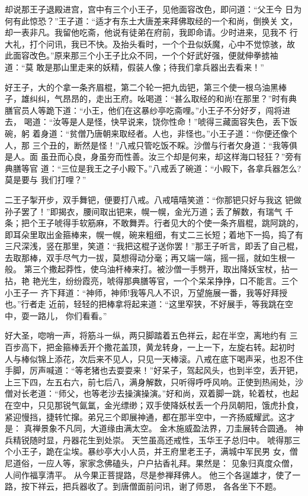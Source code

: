 却说那王子退殿进宫，宫中有三个小王子，见他面容改色，即问道：“父王今
日为何有此惊恐？”王子道：“适才有东土大唐差来拜佛取经的一个和尚，倒换关
文，却一表非凡。我留他吃斋，他说有徒弟在府前，我即命请。少时进来，见我不
行大礼，打个问讯，我已不快。及抬头看时，一个个丑似妖魔，心中不觉惊骇，故
此面容改色。”原来那三个小王子比众不同，一个个好武好强，便就伸拳掳袖道：“莫
敢是那山里走来的妖精，假装人像；待我们拿兵器出去看来！”

好王子，大的个拿一条齐眉棍，第二个轮一把九齿钯，第三个使一根乌油黑棒
子，雄纠纠，气昂昂的，走出王府。吆喝道：“甚么取经的和尚!在那里？”时有典
膳官员人等跪下道：“小王，他们在这暴纱亭吃斋哩。”小王子不分好歹，闯将进去，
喝道：“汝等是人是怪，快早说来，饶你性命！”唬得三藏面容失色，丢下饭碗，躬
着身道：“贫僧乃唐朝来取经者。人也，非怪也。”小王子道：“你便还像个人，那
三个丑的，断然是怪！”八戒只管吃饭不睬。沙僧与行者欠身道：“我等俱是人。面
虽丑而心良，身虽夯而性善。汝三个却是何来，却这样海口轻狂？”旁有典膳等官
道：“三位是我王之子小殿下。”八戒丢了碗道：“小殿下，各拿兵器怎么?莫是要与
我们打哩？”

二王子掣开步，双手舞钯，便要打八戒。八戒嘻嘻笑道：“你那钯只好与我这
钯做孙子罢了！”即揭衣，腰间取出钯来，幌一幌，金光万道；丢了解数，有瑞气
千条；把个王子唬得手软筋麻，不敢舞弄。行者见大的个使一条齐眉棍，跳阿跳的，
即耳朵里取出金箍棒来，幌一幌，碗来粗细，有丈二三长短；着地下一捣，捣了有
三尺深浅，竖在那里，笑道：“我把这棍子送你罢！”那王子听言，即丢了自己棍，
去取那棒，双手尽气力一拔，莫想得动分毫；再又端一端，摇一摇，就如生根一般。
第三个撒起莽性，使乌油杆棒来打。被沙僧一手劈开，取出降妖宝杖，拈一拈，艳
艳光生，纷纷霞亮，唬得那典膳等官，一个个呆呆挣挣，口不能言。三个小王子一
齐下拜道：“神师，神师!我等凡人不识，万望施展一番，我等好拜授也。”行者走
近前，轻轻的把棒拿将起来道：“这里窄狭，不好展手，等我跳在空中，耍一路儿，
你们看看。”

好大圣，唿哨一声，将筋斗一纵，两只脚踏着五色祥云，起在半空，离地约有
三百步高下，把金箍棒丢开个撒花盖顶，黄龙转身，一上一下，左旋右转。起初时
人与棒似锦上添花，次后来不见人，只见一天棒滚。八戒在底下喝声采，也忍不住
手脚，厉声喊道：“等老猪也去耍耍来！”好呆子，驾起风头，也到半空，丢开钯，
上三下四，左五右六，前七后八，满身解数，只听得呼呼风响。正使到热闹处，沙
僧对长老道：“师父，也等老沙去操演操演。”好和尚，双着脚一跳，轮着杖，也起
在空中，只见那锐气氤氲，金光缥缈；双手使降妖杖丢一个丹凤朝阳，饿虎扑食，
紧迎慢挡，捷转忙撺。弟兄三个即展神通，都在那半空中，一齐扬威耀武。这才是：
真禅景象不凡同，大道缘由满太空。
金木施威盈法界，刀圭展转合圆通。
神兵精锐随时显，丹器花生到处崇。
天竺虽高还戒性，玉华王子总归中。
唬得那三个小王子，跪在尘埃。暴纱亭大小人员，并王府里老王子，满城中军民男
女，僧尼道俗，一应人等，家家念佛磕头，户户拈香礼拜。果然是：
见象归真度众僧，人间作福享清平。
从今果正菩提路，尽是参禅拜佛人。
他三个各逞雄才，使了一路，按下祥云，把兵器收了。到唐僧面前问讯，谢了师恩，
各各坐下不题。

